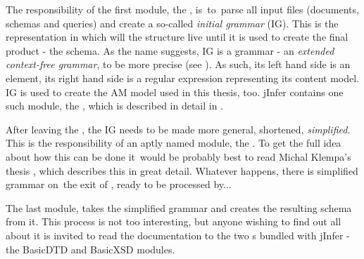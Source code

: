 The responsibility of the first module, the , is~to~parse all input files (documents, schemas and queries) and create a so-called \textit{initial grammar} (IG). 
This is the representation in which will the structure live until it is used to create the final product - the schema. As the name suggests, IG is a grammar - an \textit{extended context-free grammar}, to be more precise (see \cite{extendedcfg}). As such, its left hand side is an element, its right hand side is a regular expression representing its content model. IG is used to create the AM model used in this thesis, too. jInfer contains one such module, the , which is described in detail in \cite{basiciggdoc}.

After leaving the , the IG needs to be made more general, shortened, \textit{simplified}. This is the responsibility of an aptly named module, the . To get the full idea about how this can be done it~would be probably best to read Michal Klempa's thesis \cite{anti}, which describes this in great detail. Whatever happens, there is simplified grammar on~the exit of , ready to be processed by...

The last module,  takes the simplified grammar and creates the resulting schema from it. This process is not too interesting, but anyone wishing to find out all about it is invited to read the documentation to the two s bundled with jInfer - the BasicDTD and BasicXSD modules.
